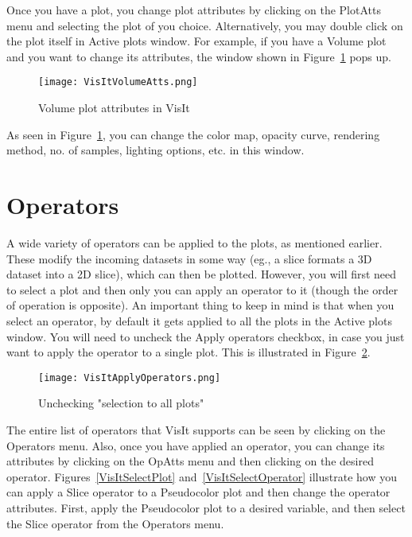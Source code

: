 Once you have a plot, you change plot attributes by clicking on the PlotAtts menu and selecting the plot of you choice. Alternatively, you may double click on the plot itself in Active plots window. For example, if you have a Volume plot and you want to change its attributes, the window shown in Figure~\ref{VisItVolumeAtts} pops up.

\begin{figure}
  \center
  \texttt{[image: VisItVolumeAtts.png]}
  \caption{Volume plot attributes in VisIt}
  \label{VisItVolumeAtts}
\end{figure}

As seen in Figure~\ref{VisItVolumeAtts}, you can change the color map, opacity curve, rendering method, no. of samples, lighting options, etc. in this window.

\section{Operators}

A wide variety of operators can be applied to the plots, as mentioned earlier. These modify the incoming datasets in some way (eg., a slice formats a 3D dataset into a 2D slice), which can then be plotted. However, you will first need to select a plot and then only you can apply an operator to it (though the order of operation is opposite). An important thing to keep in mind is that when you select an operator, by default it gets applied to all the plots in the Active plots window. You will need to uncheck the Apply operators checkbox, in case you just want to apply the operator to a single plot. This is illustrated in Figure~\ref{VisItApplyOperators}.

\begin{figure}
  \center
  \texttt{[image: VisItApplyOperators.png]}
  \caption{Unchecking "selection to all plots"}
  \label{VisItApplyOperators}
\end{figure}

The entire list of operators that VisIt supports can be seen by clicking on the Operators menu. Also, once you have applied an operator, you can change its attributes by clicking on the OpAtts menu and then clicking on the desired operator.
Figures~\ref{VisItSelectPlot} and~\ref{VisItSelectOperator} illustrate how you can apply a Slice operator to a Pseudocolor plot and then change the operator attributes.
First, apply the Pseudocolor plot to a desired variable, and then select the Slice operator from the Operators menu.

